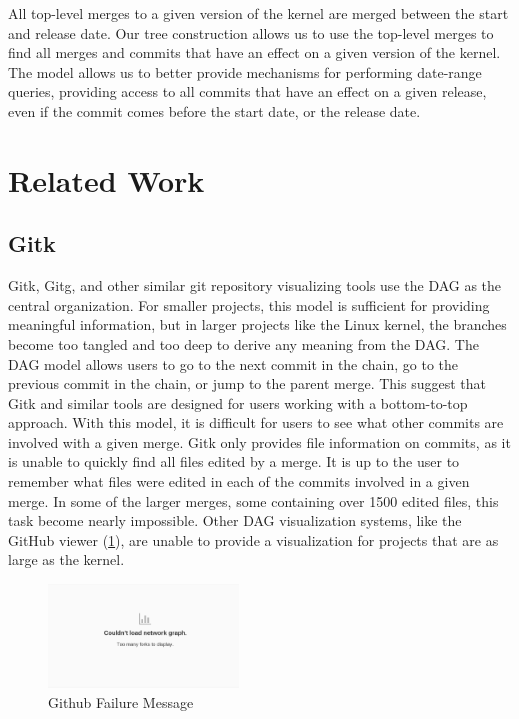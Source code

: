 \documentclass[conference, draftclsnofoot]{IEEEtran}
\begin{document}
All top-level merges to a given version of the kernel are merged between the
start and release date. Our tree construction allows us to use the top-level
merges to find all merges and commits that have an effect on a given version of
the kernel. The model allows us to better provide mechanisms for performing
date-range queries, providing access to all commits that have an effect on a
given release, even if the commit comes before the start date, or the release
date.

\section{Related Work}

\subsection{Gitk}
Gitk, Gitg, and other similar git repository visualizing tools use the DAG as
the central organization. For smaller projects, this model is sufficient for
providing meaningful information, but in larger projects like the Linux kernel,
the branches become too tangled and too deep to derive any meaning from the
DAG. The DAG model allows users to go to the next commit in the chain, go to
the previous commit in the chain, or jump to the parent merge. This suggest
that Gitk and similar tools are designed for users working with a bottom-to-top
approach. With this model, it is difficult for users to see what other commits
are involved with a given merge. Gitk only provides file information on
commits, as it is unable to quickly find all files edited by a merge. It is up
to the user to remember what files were edited in each of the commits involved
in a given merge. In some of the larger merges, some containing over 1500
edited files, this task become nearly impossible.
Other DAG visualization systems, like the GitHub viewer (\ref{fig:gitfail}),
are unable to provide a visualization for projects that are as large as the
kernel.

\begin{figure}[h!]
	\centering
	\includegraphics[width=0.45\textwidth]{figures/github_viewer.png}
	\caption{Github Failure Message}
	\label{fig:gitfail}
\end{figure}
\end{document}

